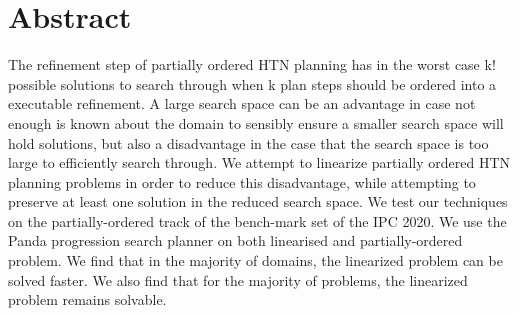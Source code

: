 \chapter*{Abstract}

The refinement step of partially ordered HTN planning has in the worst case k! possible solutions to search through when k plan steps should be ordered into a executable refinement.
A large search space can be an advantage in case not enough is known about the domain to sensibly ensure a smaller search space will hold solutions,
but also a disadvantage in the case that the search space is too large to efficiently search through. We attempt to linearize partially ordered HTN planning problems in 
order to reduce this disadvantage, while attempting to preserve at least one solution in the reduced search space.
We test our techniques on the partially-ordered track of the bench-mark set of the IPC 2020. We use the Panda progression search planner on both linearised and partially-ordered problem. 
We find that in the majority of domains, the linearized problem can be solved faster. We also find that for the majority of problems, the linearized problem remains solvable.